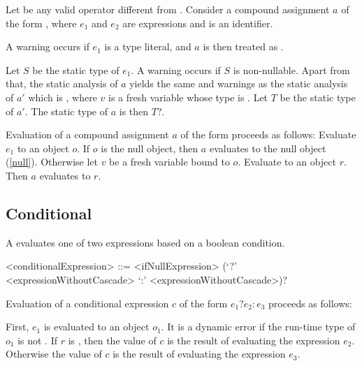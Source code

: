 \documentclass[makeidx]{article}
\begin{document}
{\LMHash{}%
Let \op{} be any valid operator different from .
Consider a compound assignment $a$
of the form ,
where $e_1$ and $e_2$ are expressions and \id{} is an identifier.

\LMHash{}%
A warning occurs if $e_1$ is a type literal,
and $a$ is then treated as .

\LMHash{}%
Let $S$ be the static type of $e_1$.
A warning occurs if $S$ is non-nullable.
Apart from that,
the static analysis of $a$ yields
the same  and warnings as
the static analysis of $a'$ which is ,
where $v$ is a fresh variable whose type is .
Let $T$ be the static type of $a'$.
The static type of $a$ is then $T?$.

\LMHash{}%
Evaluation of a compound assignment $a$ of the form
proceeds as follows:
Evaluate $e_1$ to an object $o$.
If $o$ is the null object, then $a$ evaluates to the null object (\ref{null}).
Otherwise let $v$ be a fresh variable bound to $o$.
Evaluate  to an object $r$.
Then $a$ evaluates to $r$.
\EndCase


\subsection{Conditional}

\LMHash{}%
A  evaluates one of two expressions
based on a boolean condition.

\begin{grammar}
<conditionalExpression> ::= <ifNullExpression>
  \gnewline{} (`?' <expressionWithoutCascade> `:' <expressionWithoutCascade>)?
\end{grammar}

\LMHash{}%
Evaluation of a conditional expression $c$ of the form $e_1 ? e_2 : e_3$
proceeds as follows:

\LMHash{}%
First, $e_1$ is evaluated to an object $o_1$.
It is a dynamic error if the run-time type of $o_1$ is not .
If $r$ is \TRUE, then the value of $c$ is
the result of evaluating the expression $e_2$.
Otherwise the value of $c$ is the result of evaluating the expression $e_3$.

}
\end{document}
